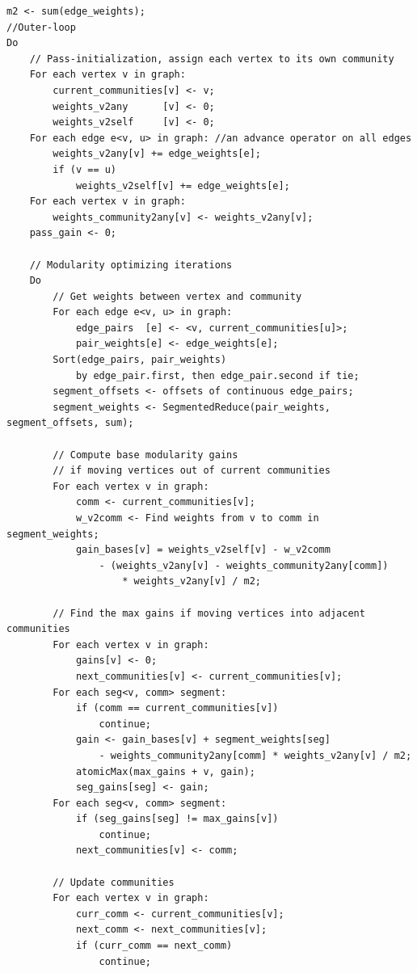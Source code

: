 \documentclass[10pt,article,oneside]{memoir}
\begin{document}
\begin{verbatim}
m2 <- sum(edge_weights);
//Outer-loop
Do
    // Pass-initialization, assign each vertex to its own community
    For each vertex v in graph:
        current_communities[v] <- v;
        weights_v2any      [v] <- 0;
        weights_v2self     [v] <- 0;
    For each edge e<v, u> in graph: //an advance operator on all edges
        weights_v2any[v] += edge_weights[e];
        if (v == u)
            weights_v2self[v] += edge_weights[e];
    For each vertex v in graph:
        weights_community2any[v] <- weights_v2any[v];
    pass_gain <- 0;

    // Modularity optimizing iterations
    Do
        // Get weights between vertex and community
        For each edge e<v, u> in graph:
            edge_pairs  [e] <- <v, current_communities[u]>;
            pair_weights[e] <- edge_weights[e];
        Sort(edge_pairs, pair_weights)
            by edge_pair.first, then edge_pair.second if tie;
        segment_offsets <- offsets of continuous edge_pairs;
        segment_weights <- SegmentedReduce(pair_weights, segment_offsets, sum);

        // Compute base modularity gains
        // if moving vertices out of current communities
        For each vertex v in graph:
            comm <- current_communities[v];
            w_v2comm <- Find weights from v to comm in segment_weights;
            gain_bases[v] = weights_v2self[v] - w_v2comm
                - (weights_v2any[v] - weights_community2any[comm])
                    * weights_v2any[v] / m2;

        // Find the max gains if moving vertices into adjacent communities
        For each vertex v in graph:
            gains[v] <- 0;
            next_communities[v] <- current_communities[v];
        For each seg<v, comm> segment:
            if (comm == current_communities[v])
                continue;
            gain <- gain_bases[v] + segment_weights[seg]
                - weights_community2any[comm] * weights_v2any[v] / m2;
            atomicMax(max_gains + v, gain);
            seg_gains[seg] <- gain;
        For each seg<v, comm> segment:
            if (seg_gains[seg] != max_gains[v])
                continue;
            next_communities[v] <- comm;

        // Update communities
        For each vertex v in graph:
            curr_comm <- current_communities[v];
            next_comm <- next_communities[v];
            if (curr_comm == next_comm)
                continue;


\end{verbatim}
\end{document}
